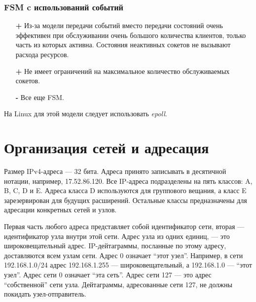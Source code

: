 \subsubsection{FSM c использований событий}
\begin{itemize}
  \item[\textbf{+}] Из-за модели передачи событий вместо передачи состояний очень эффективен при обслуживании очень большого количества клиентов, только часть из которых активна. Состояния неактивных сокетов не вызывают расхода ресурсов.
  \item[\textbf{+}] Не имеет ограничений на максимальное количество обслуживаемых сокетов.
  \item[\textbf{-}] Все еще FSM.
\end{itemize}

На Linux для этой модели следует использовать \emph{epoll}.

\section{Организация сетей и адресация}
\label{sec:network-setup}

Размер IPv4-адреса --- 32 бита. Адреса принято записывать в десятичной нотации, например, 17.52.86.120. Все IP-адреса подразделены на пять классов: A, B, C, D и E. Адреса класса D используются для группового вещания, а класс E зарезервирован для будущих расширений. Остальные классы предназначены для адресации конкретных сетей и узлов.

Первая часть любого адреса представляет собой идентификатор сети, вторая --- идентификатор узла внутри этой сети. Адрес узла из одних единиц, --- это широковещательный адрес. IP-дейтаграммы, посланные по этому адресу, доставляются всем узлам сети. Адрес 0 означает ``этот узел''. Например, в сети 192.168.1.0/24 адрес 192.168.1.255 --- широковещательный, а 192.168.1.0 --- ``этот узел''. Адрес сети 0 означает ``эта сеть''. Адрес сети 127 --- это адрес ``собственной'' сети узла. Дейтаграммы, адресованные сети 127, не должны покидать узел-отправитель.

